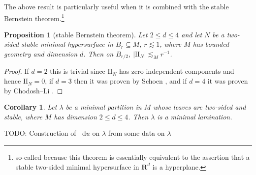 \documentclass[reqno,10pt]{amsart}
\newcommand{\RR}{\mathbf{R}}
\newcommand*\dif{\mathop{}\!\mathrm{d}}
\newcommand{\Two}{\mathrm{I\!I}}
\newtheorem{proposition}[theorem]{Proposition}
\newtheorem{corollary}[theorem]{Corollary}
\theoremstyle{definition}
\numberwithin{equation}{section}
\begin{document}
The above result is particularly useful when it is combined with the stable Bernstein theorem.\footnote{so-called because this theorem is essentially equivalent to the assertion that a stable two-sided minimal hypersurface in $\RR^d$ is a hyperplane.}

\begin{proposition}[stable Bernstein theorem]
Let $2 \leq d \leq 4$ and let $N$ be a two-sided stable minimal hypersurface in $B_r \subseteq M$, $r \lesssim 1$, where $M$ has bounded geometry and dimension $d$.
Then on $B_{r/2}$, $|\Two_N| \lesssim_M r^{-1}$.
\end{proposition}
\begin{proof}
If $d = 2$ this is trivial since $\Two_N$ has zero independent components and hence $\Two_N = 0$, if $d = 3$ then it was proven by Schoen \cite[Corollary 2.11]{colding2011course}, and if $d = 4$ it was proven by Chodosh--Li \cite{Chodosh2021}.
\end{proof}

\begin{corollary}
Let $\lambda$ be a minimal partition in $M$ whose leaves are two-sided and stable, where $M$ has dimension $2 \leq d \leq 4$.
Then $\lambda$ is a minimal lamination.
\end{corollary}

TODO: Construction of $\dif u$ on $\lambda$ from some data on $\lambda$


\printbibliography
\end{document}
